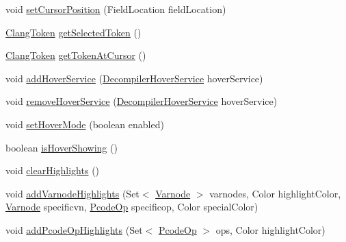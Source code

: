 \begin{DoxyCompactItemize}
\item 
void \mbox{\hyperlink{classghidra_1_1app_1_1decompiler_1_1component_1_1_decompiler_panel_a5a0fe98890d4b8acb672196560f86459}{set\+Cursor\+Position}} (Field\+Location field\+Location)
\item 
\mbox{\hyperlink{classghidra_1_1app_1_1decompiler_1_1_clang_token}{Clang\+Token}} \mbox{\hyperlink{classghidra_1_1app_1_1decompiler_1_1component_1_1_decompiler_panel_aedc72ee698aa7fdc9b1b2f892b0fc3db}{get\+Selected\+Token}} ()
\item 
\mbox{\hyperlink{classghidra_1_1app_1_1decompiler_1_1_clang_token}{Clang\+Token}} \mbox{\hyperlink{classghidra_1_1app_1_1decompiler_1_1component_1_1_decompiler_panel_a1c849d9b5f8b27ccd7f5cb04404f4dc5}{get\+Token\+At\+Cursor}} ()
\item 
void \mbox{\hyperlink{classghidra_1_1app_1_1decompiler_1_1component_1_1_decompiler_panel_a19c6d21a4fa34c95ae27816ffe2fa5aa}{add\+Hover\+Service}} (\mbox{\hyperlink{interfaceghidra_1_1app_1_1decompiler_1_1component_1_1hover_1_1_decompiler_hover_service}{Decompiler\+Hover\+Service}} hover\+Service)
\item 
void \mbox{\hyperlink{classghidra_1_1app_1_1decompiler_1_1component_1_1_decompiler_panel_aabb5b076308bdfe1c2a8070a20eb63a6}{remove\+Hover\+Service}} (\mbox{\hyperlink{interfaceghidra_1_1app_1_1decompiler_1_1component_1_1hover_1_1_decompiler_hover_service}{Decompiler\+Hover\+Service}} hover\+Service)
\item 
void \mbox{\hyperlink{classghidra_1_1app_1_1decompiler_1_1component_1_1_decompiler_panel_ad506e0f6404f530197c697471aad3594}{set\+Hover\+Mode}} (boolean enabled)
\item 
boolean \mbox{\hyperlink{classghidra_1_1app_1_1decompiler_1_1component_1_1_decompiler_panel_a88f183c3b2c4bb3860ad881c80f00027}{is\+Hover\+Showing}} ()
\item 
void \mbox{\hyperlink{classghidra_1_1app_1_1decompiler_1_1component_1_1_decompiler_panel_a65e87140728b77057dd7defafccf293d}{clear\+Highlights}} ()
\item 
void \mbox{\hyperlink{classghidra_1_1app_1_1decompiler_1_1component_1_1_decompiler_panel_a95b083e3ec26f9c72f78240bfc26f946}{add\+Varnode\+Highlights}} (Set$<$ \mbox{\hyperlink{class_varnode}{Varnode}} $>$ varnodes, Color highlight\+Color, \mbox{\hyperlink{class_varnode}{Varnode}} specificvn, \mbox{\hyperlink{class_pcode_op}{Pcode\+Op}} specificop, Color special\+Color)
\item 
void \mbox{\hyperlink{classghidra_1_1app_1_1decompiler_1_1component_1_1_decompiler_panel_a357e374bd4d157ddf0fcc3bd4945a566}{add\+Pcode\+Op\+Highlights}} (Set$<$ \mbox{\hyperlink{class_pcode_op}{Pcode\+Op}} $>$ ops, Color highlight\+Color)

\end{DoxyCompactItemize}
